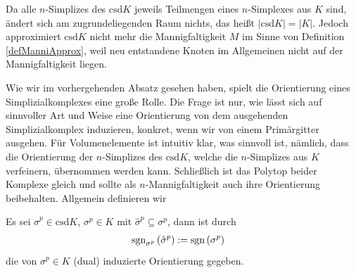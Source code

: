     \begin{bemerkung}
      Da alle \( n \)-Simplizes des \(\text{csd}K  \) jeweils Teilmengen eines \( n \)-Simplexes aus \( K \) sind, ändert sich am zugrundeliegenden Raum nichts, das heißt
      \( |\text{csd}K| = |K| \). 
      Jedoch approximiert \(\text{csd}K\) nicht mehr die Mannigfaltigkeit \( M \) im Sinne von Definition \ref{defManniApprox}, 
      weil neu entstandene Knoten im Allgemeinen nicht auf der Mannigfaltigkeit
      liegen. 
    \end{bemerkung}

    Wie wir im vorhergehenden Absatz gesehen haben, spielt die Orientierung eines Simplizialkomplexes eine große Rolle. Die Frage ist nur,
    wie lässt sich auf sinnvoller Art und Weise eine Orientierung von dem ausgehenden Simplizialkomplex induzieren, konkret, wenn wir von
    einem Primärgitter ausgehen.
    Für Volumenelemente ist intuitiv klar, was sinnvoll ist, nämlich, dass die Orientierung der \( n \)-Simplizes des  \( \text{csd}K \),
    welche die \( n \)-Simplizes aus  \( K \) verfeinern, übernommen werden kann. Schließlich ist das Polytop beider Komplexe gleich und
    sollte als \( n \)-Mannigfaltigkeit auch ihre Orientierung beibehalten.
    Allgemein definieren wir

    \begin{definition}
      \label{defDualInduzierteOrientierung}
      Es sei \( \hat{\sigma}^{p} \in \text{csd}K \), \( \sigma^{p} \in K \) mit \( \hat{\sigma}^{p} \subseteq \sigma^{p}\), dann ist durch
      \begin{align}
        \mathop{\mathrm{sgn}}\nolimits_{\sigma^{p}}\left( \hat{\sigma}^{p} \right) &:= \mathop{\mathrm{sgn}}\nolimits\left( \sigma^{p} \right)
      \end{align}
      die von \( \sigma^{p}\in K \) (dual) induzierte Orientierung gegeben. 
    \end{definition}

